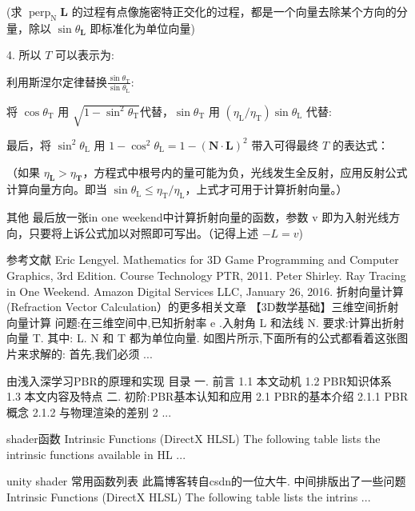 (求 \(\operatorname { perp } _ { \mathrm { N } } \mathbf { L }\) 的过程有点像施密特正交化的过程，都是一个向量去除某个方向的分量，除以 \(\sin \theta _ { \mathbf { L } }\) 即标准化为单位向量)

4. 所以 \(T\) 可以表示为:


利用斯涅尔定律替换\(\frac { \sin \theta _ { \mathrm { T } } } { \sin \theta _ { \mathrm { L } } }\):



将 \(\cos \theta _ { \mathrm { T } }\) 用 \(\sqrt { 1 - \sin ^ { 2 } \theta _ { \mathrm { T } } }\)代替，\(\sin \theta _ { \mathrm { T } }\) 用 \(\left( \eta _ { \mathrm { L } } / \eta _ { \mathrm { T } } \right) \sin \theta _ { \mathrm { L } }\) 代替:



最后，将 \(\sin ^ { 2 } \theta _ { \mathrm { L } }\) 用 \(1 - \cos ^ { 2 } \theta _ { \mathrm { L } } = 1 - ( \mathbf { N } \cdot \mathbf { L } ) ^ { 2 }\) 带入可得最终 \(T\) 的表达式：


（如果 \(\eta _ { \mathbf { L } } > \eta _ { \mathbf { T } }\)，方程式中根号内的量可能为负，光线发生全反射，应用反射公式计算向量方向。即当 \(\sin \theta _ { \mathrm { L } } \leq \eta _ { \mathrm { T } } / \eta _ { \mathrm { L } }\)，上式才可用于计算折射向量。）

其他
最后放一张in one weekend中计算折射向量的函数，参数 v 即为入射光线方向，只要将上诉公式加以对照即可写出。（记得上述 \(-L=v\))


参考文献
Eric Lengyel. Mathematics for 3D Game Programming and Computer Graphics, 3rd Edition. Course Technology PTR, 2011.
Peter Shirley. Ray Tracing in One Weekend. Amazon Digital Services LLC, January 26, 2016.
折射向量计算(Refraction Vector Calculation）的更多相关文章
【3D数学基础】三维空间折射向量计算
问题:在三维空间中,已知折射率 e .入射角 L 和法线 N. 要求:计算出折射向量 T. 其中: L. N 和 T 都为单位向量. 如图片所示,下面所有的公式都看着这张图片来求解的: 首先,我们必须 ...

由浅入深学习PBR的原理和实现
目录 一. 前言 1.1 本文动机 1.2 PBR知识体系 1.3 本文内容及特点 二. 初阶:PBR基本认知和应用 2.1 PBR的基本介绍 2.1.1 PBR概念 2.1.2 与物理渲染的差别 2 ...

shader函数
Intrinsic Functions (DirectX HLSL) The following table lists the intrinsic functions available in HL ...

unity shader 常用函数列表
此篇博客转自csdn的一位大牛. 中间排版出了一些问题 Intrinsic Functions (DirectX HLSL) The following table lists the intrins ...

